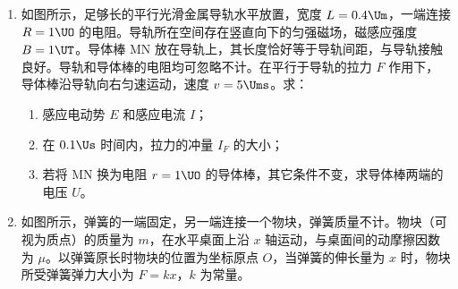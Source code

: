 \documentclass[\gkver]{gaokaozhenti}
\begin{document}
\begin{enumerate}
\item
如图所示，足够长的平行光滑金属导轨水平放置，宽度 $L=0.4\Um$，一端连接 $R=1\UO$ 的电阻。导轨所在空间存在竖直向下的匀强磁场，磁感应强度 $B=1\UT$。导体棒 MN 放在导轨上，其长度恰好等于导轨间距，与导轨接触良好。导轨和导体棒的电阻均可忽略不计。在平行于导轨的拉力 $F$ 作用下，导体棒沿导轨向右匀速运动，速度 $v=5\Ums$。求：

\begin{enumerate}
	\item
	感应电动势 $E$ 和感应电流 $I$；
	\item
	在 $0.1\Us$ 时间内，拉力的冲量 $I_{F}$ 的大小；
	\item
	若将 MN 换为电阻 $r=1\UO$ 的导体棒，其它条件不变，求导体棒两端的电压 $U$。
\end{enumerate}



\item
如图所示，弹簧的一端固定，另一端连接一个物块，弹簧质量不计。物块（可视为质点）的质量为 $m$，在水平桌面上沿 $x$ 轴运动，与桌面间的动摩擦因数为 $\mu$。以弹簧原长时物块的位置为坐标原点 $O$，当弹簧的伸长量为 $x$ 时，物块所受弹簧弹力大小为 $F=kx$，$k$ 为常量。


\end{enumerate}
\end{document}
